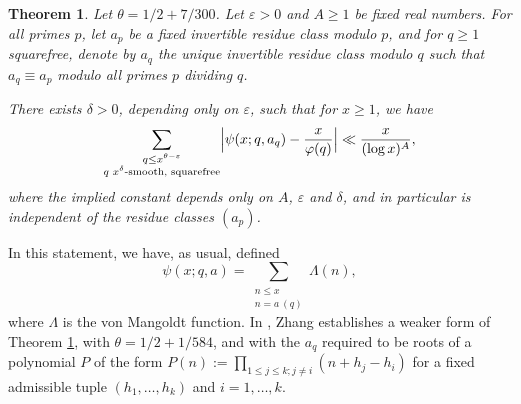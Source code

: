 \documentclass[12pt,a4paper,reqno]{amsart}
\numberwithin{equation}{section}
\theoremstyle{plain}
\newtheorem{theorem}{Theorem}[section]
\newtheorem{claim}[theorem]{Claim}
\theoremstyle{definition}
\newcommand\eps{\varepsilon}
\newcommand\B{\operatorname{B}}
\begin{document}
\begin{theorem}\label{th-main}
  Let $\theta=1/2+7/300$.  Let $\eps>0$ and $A\geq 1$ be fixed real
  numbers. For all primes $p$, let $a_p$ be a fixed invertible
  residue class modulo $p$, and for $q\geq 1$ squarefree, denote by
  $a_q$ the unique invertible  residue class modulo $q$ such that
  $a_q\equiv a_p$ modulo all primes $p$ dividing $q$.
\par
There exists $\delta>0$, depending only on $\eps$, such that for
$x\geq 1$, we have
$$
\sum_{\substack{q\leq x^{\theta-\eps}\\q\text{ $x^{\delta}$-smooth,
      squarefree}}} \Bigl|\psi(x;q,a_q)-\frac{x}{\varphi(q)}\Bigr| \ll
\frac{x}{(\log x)^A},
$$
where the implied constant depends only on $A$, $\eps$ and $\delta$,
and in particular is independent of the residue classes $(a_p)$.
\end{theorem}

In this statement, we have, as usual, defined
$$
\psi(x;q,a)=\sum_{\substack{n\leq x\\n=a\ (q)}}\Lambda(n),
$$
where $\Lambda$ is the von Mangoldt function.  In \cite{zhang}, Zhang establishes a weaker form of Theorem \ref{th-main}, with
  $\theta=1/2+1/584$, and with the $a_q$ required to be roots of a polynomial $P$ of the form $P(n) := \prod_{1 \leq j \leq k; j \neq i} (n+h_j-h_i)$ for a fixed admissible tuple $(h_1,\dots,h_k)$ and $i=1,\dots,k$.




\end{document}
